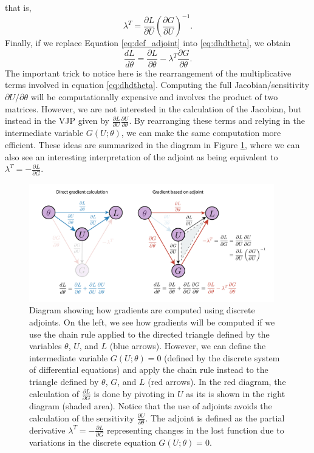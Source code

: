 that is,
\begin{equation}
    \lambda^T = \frac{\partial L}{\partial U} \left( \frac{\partial G}{\partial U} \right)^{-1}.
    \label{eq:def_adjoint}
\end{equation}
Finally, if we replace Equation \eqref{eq:def_adjoint} into \eqref{eq:dhdtheta}, we obtain 
\begin{equation}
    \frac{dL}{d\theta} 
    =
    \frac{\partial L}{\partial \theta} 
    - 
    \lambda^T \frac{\partial G}{\partial \theta}.
    \label{eq:gradient-adjoint-state-method}
\end{equation}
The important trick to notice here is the rearrangement of the multiplicative terms involved in equation \eqref{eq:dhdtheta}. 
Computing the full Jacobian/sensitivity $\partial U / \partial \theta$ will be computationally expensive and involves the product of two matrices. 
However, we are not interested in the calculation of the Jacobian, but instead in the VJP given by $\frac{\partial L}{\partial U} \frac{\partial U}{\partial \theta}$. 
By rearranging these terms and relying in the intermediate variable $G(U; \theta)$, we can make the same computation more efficient. 
These ideas are summarized in the diagram in Figure \ref{fig:discrete-adjoint}, where we can also see an interesting interpretation of the adjoint as being equivalent to $\lambda^T = - \frac{\partial L}{\partial G}$. 

\begin{figure}[t]
    \centering
    \includegraphics[width=0.95\textwidth]{figures/discrete_adjoint.pdf}
    \caption{Diagram showing how gradients are computed using discrete adjoints. On the left, we see how gradients will be computed if we use the chain rule applied to the directed triangle defined by the variables $\theta$, $U$, and $L$ (blue arrows). However, we can define the intermediate variable $G(U; \theta) = 0$ (defined by the discrete system of differential equations) and apply the chain rule instead to the triangle defined by $\theta$, $G$, and $L$ (red arrows). In the red diagram, the calculation of $\frac{\partial L}{\partial G}$ is done by pivoting in $U$ as its is shown in the right diagram (shaded area). Notice that the use of adjoints avoids the calculation of the sensitivity $\frac{\partial U}{\partial \theta}$. The adjoint is defined as the partial derivative $\lambda^T = - \frac{\partial L}{\partial G}$ representing changes in the lost function due to variations in the discrete equation $G(U; \theta) = 0$. 
    }
    \label{fig:discrete-adjoint}
\end{figure}


